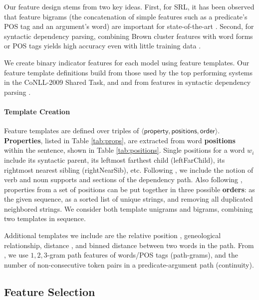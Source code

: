 \documentclass[11pt]{article}
\newcommand{\prop}[1]{\emph{#1}}
\newcommand{\posi}[1]{{\scriptsize\textsf{#1}}}
\newcommand{\feat}[3]{{\mod{#2}(\posi{#1}).\prop{#3}}}
\renewcommand{\feat}[1]{{\scriptsize\textsf{#1}}}
\begin{document}
Our feature design stems from two key ideas. First, for SRL, it has
been observed that feature bigrams (the concatenation of simple
features such as a predicate's POS tag and an argument's word) are
important for state-of-the-art
\cite{zhao_multilingual_2009,bjorkelund_multilingual_2009}. Second,
for syntactic dependency parsing, combining Brown cluster features
with word forms or POS tags yields high accuracy even with little
training data \cite{koo_simple_2008}.

We create binary indicator features for each model using feature templates. Our feature
template definitions build from those used by the top performing systems in the
CoNLL-2009 Shared Task,  and
 and from features in syntactic dependency
parsing \cite{mcdonald_online_2005,koo_simple_2008}.  

\paragraph{Template Creation}

Feature templates are defined over triples of $\mathsf{\langle property,  positions, order\rangle}$.
{\bf Properties},
 listed in Table \ref{tab:props}, are extracted from word {\bf positions} within the
sentence, shown in Table \ref{tab:positions}.
 Single positions for a word $w_i$ include its syntactic parent, its
 leftmost farthest child (\posi{leftFarChild}), its rightmost nearest
 sibling (\posi{rightNearSib}),
 etc.   Following , we include the notion of verb 
 and noun supports and sections of the dependency path. Also following
  , properties from a set of positions can be put 
  together in three possible 
 {\bf orders}: as the given sequence, as a sorted list of unique strings, and removing 
 all duplicated neighbored strings.  We consider both template unigrams and bigrams,
combining two templates in sequence.  

Additional templates we include are the relative position \cite{bjorkelund_multilingual_2009}, geneological relationship,
distance \cite{zhao_multilingual_2009},
and binned distance 
\cite{koo_simple_2008} between
two words in the path. From , we use
$1,2,3$-gram path features of words/POS tags (\feat{path-grams}), and
the number of non-consecutive token pairs in a predicate-argument path
(\feat{continuity}).   

\subsection{Feature Selection}
\label{sec:featureSelection}
\end{document}
